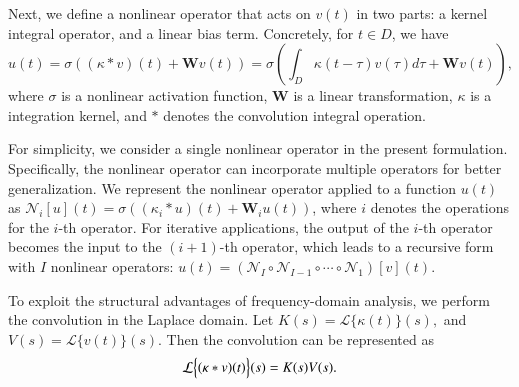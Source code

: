 Next, we define a nonlinear operator that acts on $v(t)$ in two parts: a kernel integral operator, and a linear bias term. Concretely, for $t \in D$, we have
\begin{equation}\label{eq:LNO_nonlinear}
u(t) 
 = 
\sigma \left(
(\kappa * v)(t)
 + 
\mathbf{W} v(t)
\right)
=
\sigma \left(\int_D
\kappa(t - \tau) 
v(\tau) 
d\tau
 + 
\mathbf{W} v(t)
\right),
\end{equation}
where $\sigma$ is a nonlinear activation function, $\mathbf{W}$ is a linear transformation, $\kappa$ is a integration kernel, and $*$ denotes the convolution integral operation. 
\begin{remark}
    For simplicity, we consider a single nonlinear operator in the present formulation. Specifically, the nonlinear operator can incorporate multiple operators for better generalization. We represent the nonlinear operator applied to a function $ u(t) $ as $\mathcal{N}_i[u](t) = \sigma \left( (\kappa_i * u)(t) + \mathbf{W}_i u(t) \right)$, where $i$ denotes the operations for the $i$-th operator. For iterative applications, the output of the $i$-th operator becomes the input to the $(i+1)$-th operator, which leads to a recursive form with $I$ nonlinear operators: $ u(t) = (\mathcal{N}_I \circ \mathcal{N}_{I-1} \circ \cdots \circ \mathcal{N}_1)[v](t) $. 
\end{remark}

To exploit the structural advantages of frequency-domain analysis, we perform the convolution in the Laplace domain. Let
$
K(s) 
 = 
\mathcal{L}\bigl\{\kappa(t)\bigr\}(s),$ and 
$V(s) 
 = 
\mathcal{L}\bigl\{v(t)\bigr\}(s).
$
Then the convolution can be represented as
\begin{equation}\label{eq:LNO_sdomain}
    \mathcal{L}\Bigl\{(\kappa * v)(t)\Bigr\}(s) 
 = 
K(s) V(s).
\end{equation}

